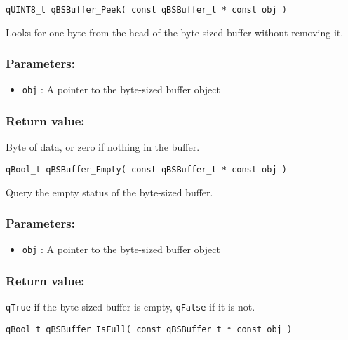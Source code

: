 \noindent\hrulefill

\begin{lstlisting}[style=CStyle]
qUINT8_t qBSBuffer_Peek( const qBSBuffer_t * const obj )
\end{lstlisting}

Looks for one byte from the head of the byte-sized buffer without removing it. 

\subsubsection*{Parameters:}
\begin{itemize}
    \item \lstinline{obj} : A pointer to the byte-sized buffer object
\end{itemize}

\subsubsection*{Return value:}
Byte of data, or zero if nothing in the buffer.

\noindent\hrulefill

\begin{lstlisting}[style=CStyle]
qBool_t qBSBuffer_Empty( const qBSBuffer_t * const obj )
\end{lstlisting}

Query the empty status of the byte-sized buffer. 

\subsubsection*{Parameters:}
\begin{itemize}
    \item \lstinline{obj} : A pointer to the byte-sized buffer object
\end{itemize}

\subsubsection*{Return value:}
\lstinline{qTrue} if the byte-sized buffer is empty, \lstinline{qFalse} if it is not.


\noindent\hrulefill

\begin{lstlisting}[style=CStyle]
qBool_t qBSBuffer_IsFull( const qBSBuffer_t * const obj )
\end{lstlisting}

